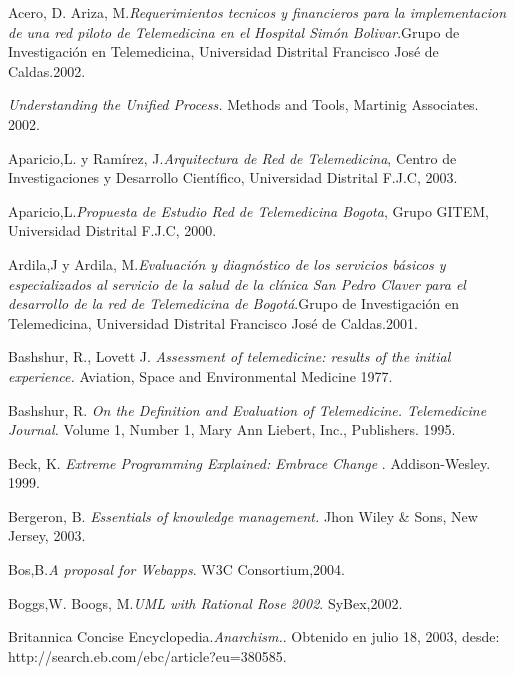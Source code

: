 \begin{thebibliography}{}

 Acero, D. Ariza, M.\textit{Requerimientos tecnicos y financieros para la implementacion de una red piloto de Telemedicina en el Hospital Simón Bolivar}.Grupo de Investigación en Telemedicina,  Universidad Distrital Francisco José de Caldas.2002.

 \textit{Understanding the Unified Process.} Methods and Tools, Martinig Associates. 2002.

 Aparicio,L. y Ramírez, J.\textit{Arquitectura de Red de Telemedicina}, Centro de Investigaciones y Desarrollo Científico, Universidad Distrital F.J.C, 2003.

 Aparicio,L.\textit{Propuesta de Estudio Red de Telemedicina Bogota}, Grupo GITEM, Universidad Distrital F.J.C, 2000.

 Ardila,J y Ardila, M.\textit{Evaluación y diagnóstico de los servicios básicos y especializados al servicio de la salud de la clínica San Pedro Claver para el desarrollo de la red de                Telemedicina de Bogotá}.Grupo de Investigación en Telemedicina,  Universidad Distrital Francisco José de Caldas.2001.


 Bashshur, R., Lovett J. \textit{Assessment of telemedicine: results of the initial experience.} Aviation, Space and Environmental Medicine 1977.

 Bashshur, R. \textit{On the Definition and Evaluation of Telemedicine. Telemedicine Journal.} Volume 1, Number 1, Mary Ann Liebert, Inc., Publishers. 1995.

 Beck, K. \textit{ Extreme Programming Explained: Embrace Change }. Addison-Wesley. 1999.

 Bergeron, B. \textit{Essentials of knowledge management.} Jhon Wiley \& Sons, New Jersey, 2003.

 Bos,B.\textit{A proposal for Webapps}. W3C Consortium,2004.

 Boggs,W. Boogs, M.\textit{UML with Rational Rose 2002}. SyBex,2002.

 Britannica Concise Encyclopedia.\textit{Anarchism.}. Obtenido en julio 18, 2003, desde:    http://search.eb.com/ebc/article?eu=380585.


\end{thebibliography}
